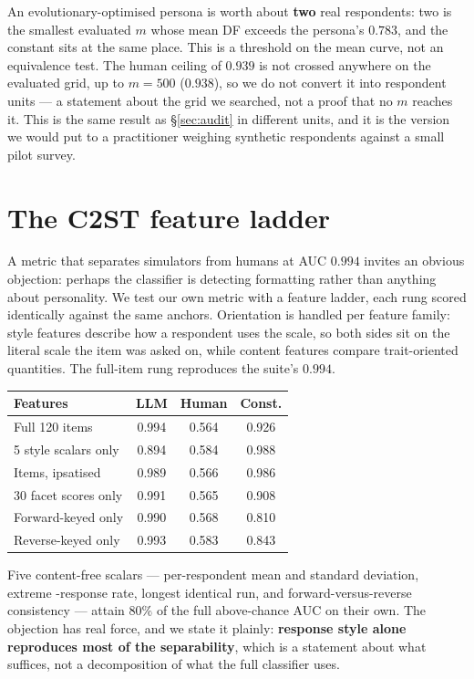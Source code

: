 \documentclass[11pt]{article}
\begin{document}
An evolutionary-optimised persona is worth about \textbf{two} real respondents:
two is the smallest evaluated $m$ whose mean DF exceeds the persona's $0.783$,
and the constant sits at the same place. This is a threshold on the mean curve,
not an equivalence test. The human ceiling of $0.939$ is not crossed anywhere on
the evaluated grid, up to $m{=}500$ ($0.938$), so we do not convert it into
respondent units --- a statement about the grid we searched, not a proof that no
$m$ reaches it. This is the same result
as \S\ref{sec:audit} in different units, and it is the version we would put to a
practitioner weighing synthetic respondents against a small pilot survey.

\section{The C2ST feature ladder}
\label{app:c2staudit}

A metric that separates simulators from humans at AUC $0.994$ invites an obvious
objection: perhaps the classifier is detecting formatting rather than anything
about personality. We test our own metric with a feature ladder, each rung scored
identically against the same anchors. Orientation is handled per feature family:
style features describe how a respondent uses the scale, so both sides sit on the
literal scale the item was asked on, while content features compare
trait-oriented quantities. The full-item rung reproduces the suite's $0.994$.

\begin{center}\footnotesize
\setlength{\tabcolsep}{4pt}
\begin{tabular}{lccc}
\toprule
Features & LLM & Human & Const.\\
\midrule
Full 120 items & 0.994 & 0.564 & 0.926\\
5 style scalars only & 0.894 & 0.584 & 0.988\\
Items, ipsatised & 0.989 & 0.566 & 0.986\\
30 facet scores only & 0.991 & 0.565 & 0.908\\
Forward-keyed only & 0.990 & 0.568 & 0.810\\
Reverse-keyed only & 0.993 & 0.583 & 0.843\\
\bottomrule
\end{tabular}
\end{center}

Five content-free scalars --- per-respondent mean and standard deviation, extreme
-response rate, longest identical run, and forward-versus-reverse consistency ---
attain $80\%$ of the full above-chance AUC on their own. The objection has real
force, and we state it plainly: \textbf{response style alone reproduces most of
the separability}, which is a statement about what suffices, not a decomposition
of what the full classifier uses.
\end{document}

